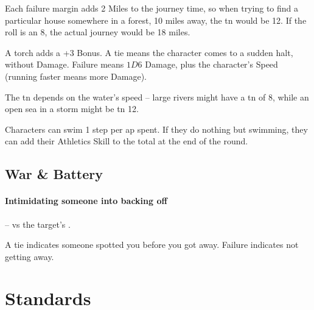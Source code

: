 \begin{multicols}{2}
\begin{itemize}
\end{itemize}

Each failure margin adds 2 Miles to the journey time, so when trying to find a particular house somewhere in a forest, 10 miles away, the \gls{tn} would be 12.
If the roll is an 8, the actual journey would be 18 miles.



A torch adds a +3 Bonus.
A tie means the character comes to a sudden halt, without Damage.
Failure means $1D6$ Damage, plus the character's Speed (running faster means more Damage).


The \gls{tn} depends on the water's speed -- large rivers might have a \gls{tn} of 8, while an open sea in a storm might be \gls{tn} 12.

Characters can swim 1 \gls{step} per \gls{ap} spent.
If they do nothing but swimming, they can add their Athletics Skill to the total at the end of the round.

\subsection{War \& Battery}


\paragraph{Intimidating someone into backing off} --  vs the target's .

A tie indicates someone spotted you before you got away.
Failure indicates not getting away.

\end{multicols}

\section{Standards}

